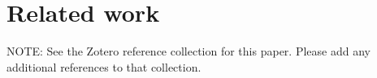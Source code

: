 \section{Related work \label{sec:relatedWork}}

NOTE: See the Zotero reference collection for this paper. Please add any additional references to that collection.